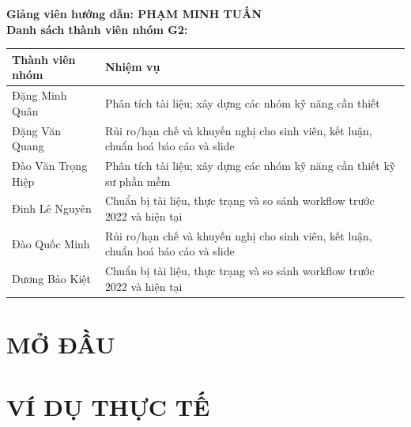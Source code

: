 \documentclass[12pt, a4paper]{article}
\begin{document}
\begin{titlepage}
    
\end{titlepage}

\newpage
\thispagestyle{fancy}
\noindent\textbf{\large Giảng viên hướng dẫn: PHẠM MINH TUẤN}\\[0.5cm]
\noindent\textbf{\large Danh sách thành viên nhóm G2:}
\vspace{0.3cm}

\renewcommand{\arraystretch}{1.4}
\begin{tabularx}{\textwidth}{|p{4.2cm}|X|}
    \hline
    \textbf{Thành viên nhóm} & \textbf{Nhiệm vụ} \\
    \hline
    Đặng Minh Quân & Phân tích tài liệu; xây dựng các nhóm kỹ năng cần thiết \\ \hline
    Đặng Văn Quang & Rủi ro/hạn chế và khuyến nghị cho sinh viên, kết luận, chuẩn hoá báo cáo và slide \\ \hline
    Đào Văn Trọng Hiệp & Phân tích tài liệu; xây dựng các nhóm kỹ năng cần thiết kỹ sư phần mềm \\ \hline 
    Đinh Lê Nguyên & Chuẩn bị tài liệu, thực trạng và so sánh workflow trước 2022 và hiện tại \\ \hline
    Đào Quốc Minh & Rủi ro/hạn chế và khuyến nghị cho sinh viên, kết luận, chuẩn hoá báo cáo và slide \\ \hline
    Dương Bảo Kiệt & Chuẩn bị tài liệu, thực trạng và so sánh workflow trước 2022 và hiện tại \\ \hline
\end{tabularx}

\newpage
\tableofcontents

\newpage 


\newpage
\section{MỞ ĐẦU}




\newpage
\section{VÍ DỤ THỰC TẾ}




\end{document}
